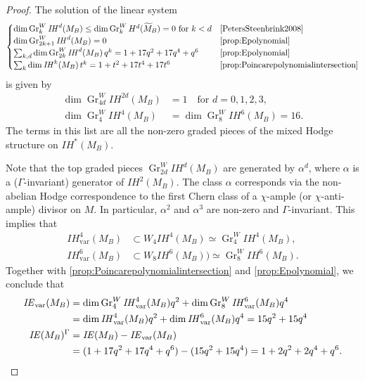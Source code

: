 \documentclass[JEP,XML,SOM,Unicode, NoEqCountersInSection,NoFloatCountersInSection,published]{cedram}
\newcommand{\IE}{\mathit{IE}}
\newcommand{\IH}{\mathit{IH}}
\theoremstyle{definition}
\newcommand{\Gr}{\operatorname{Gr}}
\begin{document}
\begin{proof}
The solution of the linear system
\[
\begin{cases}
\dim\Gr^W_{k}\IH^d(M_B) \leq \dim\Gr^W_{k} H^{d}(\widetilde{M}_B)=0 \text{ for }k<d& \text{\cite[Prop.\,4.20]{PetersSteenbrink2008}}\\
\dim \Gr^W_{2k+1}\IH^d(M_B)=0 & \text{\cref{prop:Epolynomial}}\\
\sum_{k, d} \dim \Gr^W_{2k}\IH^d(M_B) \,q^{k} = 1+17q^2+17q^4+q^{6} & \text{\cref{prop:Epolynomial}}\\
\sum_k \dim \IH^k(M_B)\,t^k = 1+t^2+17t^4+17t^6 & \text{\cref{prop:Poincarepolynomialintersection}}
\end{cases}
\]
is given by
\begin{align}\label{gradingw2d}
\dim \Gr^W_{4d} \IH^{2d}(M_B) &= 1 \quad\text{for }d=0,1,2,3,
\\
\label{gradingw4}
\dim \Gr^W_{4} \IH^4(M_B) &= \dim \Gr^W_{8} \IH^6(M_B) = 16.
\end{align}
The terms in this list are all the non-zero graded pieces of the mixed Hodge structure on $\IH^*(M_B)$.

Note that the top graded pieces $\Gr^W_{2d} \IH^d(M_B)$ are generated by $\alpha^d$, where $\alpha$ is a ($\Gamma$-invariant) generator of $\IH^2(M_B)$. The class $\alpha$ corresponds via the non-abelian Hodge correspondence to the first Chern class of a $\chi$-ample (or $\chi$-anti-ample) divisor on $M$. In particular, $\alpha^2$ and $\alpha^3$ are non-zero and $\Gamma$-invariant.
This implies that
\begin{align*}
\IH_{\mathrm{var}}^{4}(M_B) &\subset W_4 \IH^{4}(M_B) \simeq \Gr^{W}_4 \IH^{4}(M_B),\\
\IH_{\mathrm{var}}^{6}(M_B) &\subset W_8 \IH^{6}(M_B)) \simeq \Gr^{W}_8 \IH^{6}(M_B).
\end{align*} Together with \cref{prop:Poincarepolynomialintersection} and \cref{prop:Epolynomial}, we conclude that
\begin{align*}
\IE_{\mathrm{var}}(M_B) & = \dim \Gr^{W}_4 \IH^{4}_{\mathrm{var}}(M_B) q^2 + \dim \Gr^{W}_8 \IH^{6}_{\mathrm{var}}(M_B) q^4\\
& = \dim \IH^{4}_{\mathrm{var}}(M_B) q^2 + \dim \IH^{6}_{\mathrm{var}}(M_B) q^4 = 15 q^2+15q^4\\
\IE(M_B)^{\Gamma} & = \IE(M_B)-\IE_{\mathrm{var}}(M_B)\\
& = (1+17q^2+17q^4+q^6) - (15 q^2+15q^4) = 1+2q^2+2q^4+q^6.\qedhere
\end{align*}
\end{proof}
\end{document}
